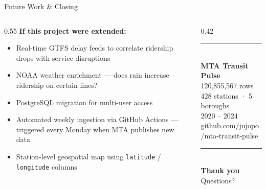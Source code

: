 \documentclass{beamer}
\begin{document}
	\begin{frame}{Future Work \& Closing}
		\begin{columns}[T]
			\begin{column}{0.55\textwidth}
				\textcolor{accentBlue}{\textbf{If this project were extended:}}
				\begin{itemize}
					\item Real-time GTFS delay feeds to correlate ridership
					drops with service disruptions
					\item NOAA weather enrichment — does rain increase
					ridership on certain lines?
					\item PostgreSQL migration for multi-user access
					\item Automated weekly ingestion via GitHub Actions —
					triggered every Monday when MTA publishes new data
					\item Station-level geospatial map using
					\texttt{latitude} / \texttt{longitude} columns
				\end{itemize}
			\end{column}
			\begin{column}{0.42\textwidth}
				\centering
				\vspace{0.5cm}
				\textcolor{accentBlue}{\rule{\textwidth}{0.4pt}}\\
				\vspace{0.4cm}
				{\Large\textbf{MTA Transit Pulse}}\\
				\vspace{0.3cm}
				{\small\textcolor{softWhite}{
						120,855,567 rows\\
						428 stations · 5 boroughs\\
						2020 -- 2024\\
				}}
				\vspace{0.3cm}
				{\scriptsize\textcolor{accentBlue}{
						github.com/jujopo/mta-transit-pulse
				}}\\
				\vspace{0.3cm}
				\textcolor{accentBlue}{\rule{\textwidth}{0.4pt}}\\
				\vspace{0.5cm}
				{\large\textbf{Thank you}}\\
				{\small Questions?}
			\end{column}
		\end{columns}
	\end{frame}
	
\end{document}
